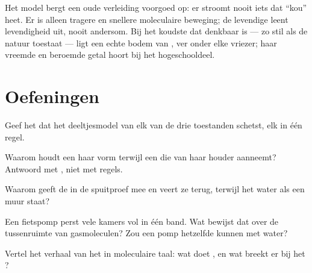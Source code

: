 \begin{example}\label{ex:g7:states-of-matter:cold}
Het model bergt een oude verleiding voorgoed op: er stroomt nooit iets
dat ``kou'' heet. Er is alleen tragere en snellere moleculaire
beweging; de levendige leent levendigheid uit, nooit andersom. Bij het
koudste dat denkbaar is ---  zo stil als de natuur toestaat
--- ligt een echte bodem van , ver onder elke vriezer; haar
vreemde en beroemde getal hoort bij het hogeschooldeel.
\end{example}

\section{Oefeningen}

\begin{exercise}[$\star$]\label{exo:g7:states-of-matter:1}
Geef het  dat het deeltjesmodel van elk van de drie toestanden
schetst, elk in één regel.
\end{exercise}

\begin{exercise}[$\star$]\label{exo:g7:states-of-matter:2}
Waarom houdt een  haar vorm terwijl een  die van
haar houder aanneemt? Antwoord met , niet met regels.
\end{exercise}

\begin{exercise}[$\star$]\label{exo:g7:states-of-matter:3}
Waarom geeft de  in de spuitproef mee en veert ze terug, terwijl
het water als een muur staat?
\end{exercise}

\begin{exercise}[$\star$]\label{exo:g7:states-of-matter:4}
Een fietspomp perst vele kamers vol  in één band. Wat bewijst dat
over de tussenruimte van gasmoleculen? Zou een pomp hetzelfde
kunnen met water?
\end{exercise}

\begin{exercise}[$\star$]\label{exo:g7:states-of-matter:5}
Vertel het verhaal van het  in moleculaire taal: wat doet
, en wat breekt er bij het ?
\end{exercise}

